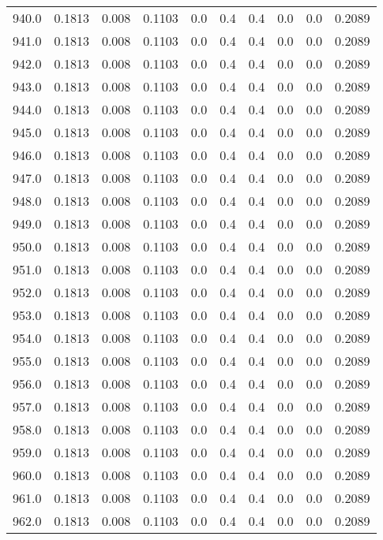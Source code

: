 \begin{longtable}{lrrrrrrrrr}
940.0 & 0.1813 & 0.008 & 0.1103 & 0.0 & 0.4 & 0.4 & 0.0 & 0.0 & 0.2089 \\
941.0 & 0.1813 & 0.008 & 0.1103 & 0.0 & 0.4 & 0.4 & 0.0 & 0.0 & 0.2089 \\
942.0 & 0.1813 & 0.008 & 0.1103 & 0.0 & 0.4 & 0.4 & 0.0 & 0.0 & 0.2089 \\
943.0 & 0.1813 & 0.008 & 0.1103 & 0.0 & 0.4 & 0.4 & 0.0 & 0.0 & 0.2089 \\
944.0 & 0.1813 & 0.008 & 0.1103 & 0.0 & 0.4 & 0.4 & 0.0 & 0.0 & 0.2089 \\
945.0 & 0.1813 & 0.008 & 0.1103 & 0.0 & 0.4 & 0.4 & 0.0 & 0.0 & 0.2089 \\
946.0 & 0.1813 & 0.008 & 0.1103 & 0.0 & 0.4 & 0.4 & 0.0 & 0.0 & 0.2089 \\
947.0 & 0.1813 & 0.008 & 0.1103 & 0.0 & 0.4 & 0.4 & 0.0 & 0.0 & 0.2089 \\
948.0 & 0.1813 & 0.008 & 0.1103 & 0.0 & 0.4 & 0.4 & 0.0 & 0.0 & 0.2089 \\
949.0 & 0.1813 & 0.008 & 0.1103 & 0.0 & 0.4 & 0.4 & 0.0 & 0.0 & 0.2089 \\
950.0 & 0.1813 & 0.008 & 0.1103 & 0.0 & 0.4 & 0.4 & 0.0 & 0.0 & 0.2089 \\
951.0 & 0.1813 & 0.008 & 0.1103 & 0.0 & 0.4 & 0.4 & 0.0 & 0.0 & 0.2089 \\
952.0 & 0.1813 & 0.008 & 0.1103 & 0.0 & 0.4 & 0.4 & 0.0 & 0.0 & 0.2089 \\
953.0 & 0.1813 & 0.008 & 0.1103 & 0.0 & 0.4 & 0.4 & 0.0 & 0.0 & 0.2089 \\
954.0 & 0.1813 & 0.008 & 0.1103 & 0.0 & 0.4 & 0.4 & 0.0 & 0.0 & 0.2089 \\
955.0 & 0.1813 & 0.008 & 0.1103 & 0.0 & 0.4 & 0.4 & 0.0 & 0.0 & 0.2089 \\
956.0 & 0.1813 & 0.008 & 0.1103 & 0.0 & 0.4 & 0.4 & 0.0 & 0.0 & 0.2089 \\
957.0 & 0.1813 & 0.008 & 0.1103 & 0.0 & 0.4 & 0.4 & 0.0 & 0.0 & 0.2089 \\
958.0 & 0.1813 & 0.008 & 0.1103 & 0.0 & 0.4 & 0.4 & 0.0 & 0.0 & 0.2089 \\
959.0 & 0.1813 & 0.008 & 0.1103 & 0.0 & 0.4 & 0.4 & 0.0 & 0.0 & 0.2089 \\
960.0 & 0.1813 & 0.008 & 0.1103 & 0.0 & 0.4 & 0.4 & 0.0 & 0.0 & 0.2089 \\
961.0 & 0.1813 & 0.008 & 0.1103 & 0.0 & 0.4 & 0.4 & 0.0 & 0.0 & 0.2089 \\
962.0 & 0.1813 & 0.008 & 0.1103 & 0.0 & 0.4 & 0.4 & 0.0 & 0.0 & 0.2089 \\

\end{longtable}
